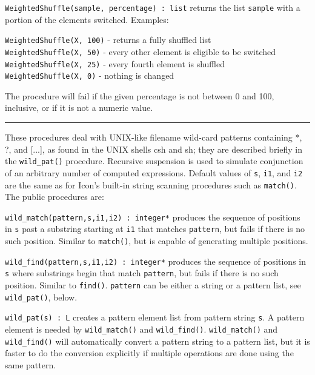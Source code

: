 \texttt{WeightedShuffle(sample, percentage) : list} returns the list
\texttt{sample} with a portion of the elements switched. Examples:

\texttt{WeightedShuffle(X, 100)} - returns a fully shuffled list\\
\texttt{WeightedShuffle(X, 50)} - every other element is eligible to be
switched\\
\texttt{WeightedShuffle(X, 25)} - every fourth element is
shuffled\\
\texttt{WeightedShuffle(X, 0)} - nothing is changed

The procedure will fail if the given percentage is not between 0 and
100, inclusive, or if it is not a numeric value.

\vspace{0.25cm}\hrule{}

These procedures deal with UNIX-like filename
wild-card patterns containing *, ?, and
[...], as found in
the UNIX shells csh and sh; they are described briefly in the
\texttt{wild\_pat()} procedure. 
Recursive suspension is used to simulate conjunction of an arbitrary number of
computed expressions.
Default values of \texttt{s}, \texttt{i1}, and \texttt{i2} are the same
as for Icon's built-in string scanning procedures such
as \texttt{match()}.
The public procedures are:

\texttt{wild\_match(pattern,s,i1,i2) : integer*} produces the sequence
of positions in \texttt{s} past a substring starting at \texttt{i1}
that matches \texttt{pattern}, but fails if there is no such position.
Similar to \texttt{match()}, but is capable of generating multiple
positions.

\texttt{wild\_find(pattern,s,i1,i2) : integer*} produces the sequence of
positions in \texttt{s} where substrings begin that match
\texttt{pattern}, but fails if there is no such position. Similar to
\texttt{find()}. \texttt{pattern} can be either a string or a pattern
list, see \texttt{wild\_pat()}, below.

\texttt{wild\_pat(s) : L} creates a pattern element list from pattern
string \texttt{s}. A pattern element is needed by
\texttt{wild\_match()} and \texttt{wild\_find()}.
\texttt{wild\_match()} and \texttt{wild\_find()} will automatically
convert a pattern string to a pattern list, but it is faster to do the
conversion explicitly if multiple operations are done using the same
pattern.

